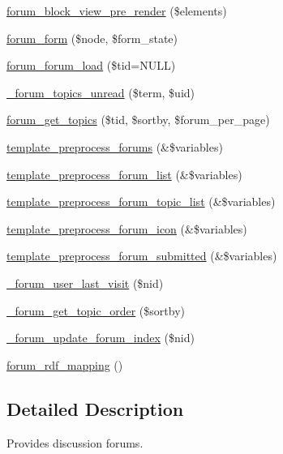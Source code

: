 \begin{DoxyCompactItemize}
\item 
\hyperlink{forum_8module_aceb291bf6ba87c91980bb20d0b6459f1}{forum\_\-block\_\-view\_\-pre\_\-render} (\$elements)
\item 
\hyperlink{forum_8module_a882c25e89e68340b62134d83ebb6fbd1}{forum\_\-form} (\$node, \$form\_\-state)
\item 
\hyperlink{forum_8module_afb6e17e15a5d0b24b812a6f628e4583f}{forum\_\-forum\_\-load} (\$tid=NULL)
\item 
\hyperlink{forum_8module_ab075ddf90e8f190a8189105743a34dd7}{\_\-forum\_\-topics\_\-unread} (\$term, \$uid)
\item 
\hyperlink{forum_8module_a507f0536bf998390e20bc196e5f58b11}{forum\_\-get\_\-topics} (\$tid, \$sortby, \$forum\_\-per\_\-page)
\item 
\hyperlink{forum_8module_ad752c10d673b2b4e95fc5e3c9847dd24}{template\_\-preprocess\_\-forums} (\&\$variables)
\item 
\hyperlink{forum_8module_ad3b69c5d2f0cbf90157149bf0c8f21a5}{template\_\-preprocess\_\-forum\_\-list} (\&\$variables)
\item 
\hyperlink{forum_8module_a1030c21aad210d17887edaea6a5aeb28}{template\_\-preprocess\_\-forum\_\-topic\_\-list} (\&\$variables)
\item 
\hyperlink{forum_8module_a5678a953a46d6c5f19c1322178d73bf1}{template\_\-preprocess\_\-forum\_\-icon} (\&\$variables)
\item 
\hyperlink{forum_8module_abb16229c10878e4cf5723284d194ca9c}{template\_\-preprocess\_\-forum\_\-submitted} (\&\$variables)
\item 
\hyperlink{forum_8module_aac8a356fca212217649b37f9ba2e8318}{\_\-forum\_\-user\_\-last\_\-visit} (\$nid)
\item 
\hyperlink{forum_8module_af12b0115e4baa8f53be8041d7f0de0e4}{\_\-forum\_\-get\_\-topic\_\-order} (\$sortby)
\item 
\hyperlink{forum_8module_a404d630b1477830133614502f7df323e}{\_\-forum\_\-update\_\-forum\_\-index} (\$nid)
\item 
\hyperlink{forum_8module_a6212a58d7fdabaa8ed8f8b21f4f53dcd}{forum\_\-rdf\_\-mapping} ()
\end{DoxyCompactItemize}


\subsection{Detailed Description}
Provides discussion forums. 

